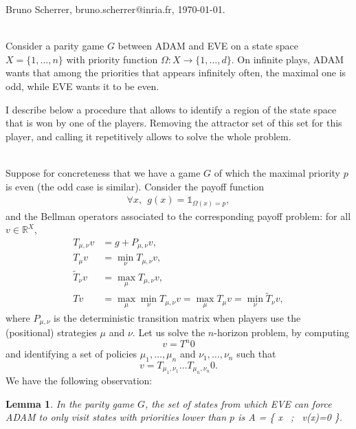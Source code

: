 \documentclass{article}
\newtheorem{lemma}{Lemma}
\def\1{{\mathds 1}}
\def\R{\mathbb R}
\begin{document}
\noindent Bruno Scherrer, bruno.scherrer@inria.fr, \today.

~\\

Consider a parity game $G$ between ADAM and EVE on a state space $X=\{1,\dots,n\}$ with priority function $\Omega:X \to \{1,\dots,d\}$. On infinite plays, ADAM wants that among the priorities that appears infinitely often, the maximal one is odd, while EVE wants it to be even.

I describe below a procedure that allows to identify a region of the state space that is won by one of the players. Removing the attractor set of this set for this player, and calling it repetitively allows to solve the whole problem.

~\\

Suppose for concreteness that we have a game $G$ of which the maximal priority $p$ is even (the odd case is similar).
Consider the payoff function
\begin{align}
  \forall x,~~ g(x) = \1_{\Omega(x)=p},
\end{align}
and the Bellman operators associated to the corresponding payoff problem: for all $v \in \R^X$,
\begin{align}
  T_{\mu,\nu} v &= g + P_{\mu,\nu}v, \\
  T_{\mu} v & = \min_\nu T_{\mu,\nu} v, \\
  \tilde T_{\nu} v & = \max_\mu T_{\mu,\nu} v, \\
   T v &= \max_\mu \min_\nu T_{\mu,\nu}v = \max_\mu T_\mu v = \min_\nu \tilde T_\nu v,
\end{align}
where $P_{\mu,\nu}$ is the deterministic transition matrix when players use the (positional) strategies $\mu$ and $\nu$.
Let us solve the $n$-horizon problem, by computing
$$
v=T^n 0
$$
and identifying a set of policies $\mu_1,\dots,\mu_n$ and $\nu_1,\dots,\nu_n$ such that
$$
v = T_{\mu_1,\nu_1} \dots T_{\mu_n,\nu_n} 0.
$$
We have the following observation:
\begin{lemma}
  In the parity game $G$, the set of states from which EVE can force ADAM to \emph{only} visit states with priorities lower than $p$ is
  A = \{ x ~;~ v(x)=0 \}.
\end{lemma}
\end{document}
